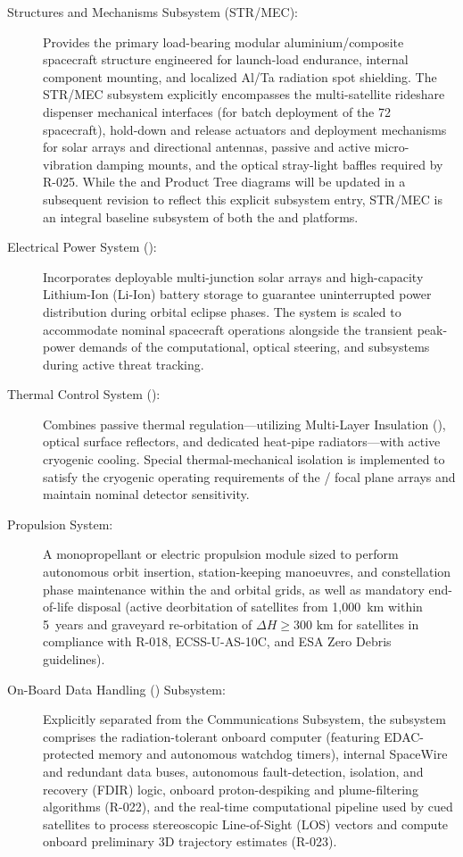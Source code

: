 \begin{description}
    \item[Structures and Mechanisms Subsystem (STR/MEC):] Provides the primary load-bearing modular aluminium/composite spacecraft structure engineered for launch-load endurance, internal component mounting, and localized Al/Ta radiation spot shielding. The STR/MEC subsystem explicitly encompasses the multi-satellite rideshare dispenser mechanical interfaces (for batch deployment of the 72  spacecraft), hold-down and release actuators and deployment mechanisms for solar arrays and directional antennas, passive and active micro-vibration damping mounts, and the optical stray-light baffles required by R-025. While the  and Product Tree diagrams will be updated in a subsequent revision to reflect this explicit subsystem entry, STR/MEC is an integral baseline subsystem of both the  and  platforms.
    \item[Electrical Power System ():] Incorporates deployable multi-junction solar arrays and high-capacity Lithium-Ion (Li-Ion) battery storage to guarantee uninterrupted power distribution during orbital eclipse phases. The system is scaled to accommodate nominal spacecraft operations alongside the transient peak-power demands of the computational, optical steering, and  subsystems during active threat tracking.
    \item[Thermal Control System ():] Combines passive thermal regulation---utilizing Multi-Layer Insulation (), optical surface reflectors, and dedicated heat-pipe radiators---with active cryogenic cooling. Special thermal-mechanical isolation is implemented to satisfy the cryogenic operating requirements of the / focal plane arrays and maintain nominal detector sensitivity.
    \item[Propulsion System:] A monopropellant or electric propulsion module sized to perform autonomous orbit insertion, station-keeping manoeuvres, and constellation phase maintenance within the  and  orbital grids, as well as mandatory end-of-life disposal (active deorbitation of  satellites from 1,000~km within 5~years and graveyard re-orbitation of $\Delta H \ge 300\text{ km}$ for  satellites in compliance with R-018, ECSS-U-AS-10C, and ESA Zero Debris guidelines).
    \item[On-Board Data Handling () Subsystem:] Explicitly separated from the Communications Subsystem, the  subsystem comprises the radiation-tolerant onboard computer (featuring EDAC-protected memory and autonomous watchdog timers), internal SpaceWire and redundant  data buses, autonomous fault-detection, isolation, and recovery (FDIR) logic, onboard proton-despiking and plume-filtering algorithms (R-022), and the real-time computational pipeline used by cued  satellites to process stereoscopic Line-of-Sight (LOS) vectors and compute onboard preliminary 3D trajectory estimates (R-023).

\end{description}
